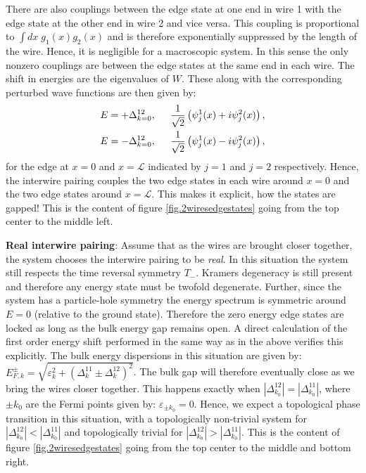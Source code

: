 There are also couplings between the edge state at one end in wire 1 with the edge state at the other end in wire 2 and vice versa. This coupling is proportional to $\int dx \; g_1(x)g_2(x)$ and is therefore exponentially suppressed by the length of the wire. Hence, it is negligible for a macroscopic system. In this sense the only nonzero couplings are between the edge states at the same end in each wire. The shift in energies are the eigenvalues of $W$. These along with the corresponding perturbed wave functions are then given by:
\begin{align}
E &= +\Delta^{12}_{k=0}, \hspace{0.5cm} \frac{1}{\sqrt{2}}\left( \psi^1_j(x) + i\psi^2_j(x) \right), \nonumber \\
E &= -\Delta^{12}_{k=0}, \hspace{0.5cm} \frac{1}{\sqrt{2}}\left(\psi^1_j(x) - i\psi^2_j(x) \right),
\label{eq.perturbededgestates}
\end{align}
for the edge at $x = 0$ and $x = \mathcal{L}$ indicated by $j = 1$ and $j = 2$ respectively. Hence, the interwire pairing couples the two edge states in each wire around $x = 0$ and the two edge states around $x = \mathcal{L}$. This makes it explicit, how the states are gapped! This is the content of figure \ref{fig.2wiresedgestates} going from the top center to the middle left. 

\textbf{Real interwire pairing}: Assume that as the wires are brought closer together, the system chooses the interwire pairing to be \textit{real}. In this situation the system still respects the time reversal symmetry $T_-$. Kramers degeneracy is still present and therefore any energy state must be twofold degenerate. Further, since the system has a particle-hole symmetry the energy spectrum is symmetric around $E = 0$ (relative to the ground state). Therefore the zero energy edge states are locked as long as the bulk energy gap remains open. A direct calculation of the first order energy shift performed in the same way as in the above verifies this explicitly. The bulk energy dispersions in this situation are given by: $E^{\pm}_{F,k} = \sqrt{\varepsilon^2_k + (\Delta^{11}_k \pm \Delta^{12}_k)^2}$. The bulk gap will therefore eventually close as we bring the wires closer together. This happens exactly when $|\Delta^{12}_{k_0}| = |\Delta^{11}_{k_0}|$, where $\pm k_0$ are the Fermi points given by: $\varepsilon_{\pm k_0} = 0$. Hence, we expect a topological phase transition in this situation, with a topologically non-trivial system for $|\Delta^{12}_{k_0}| < |\Delta^{11}_{k_0}|$ and topologically trivial for $|\Delta^{12}_{k_0}| > |\Delta^{11}_{k_0}|$. This is the content of figure \ref{fig.2wiresedgestates} going from the top center to the middle and bottom right. 

